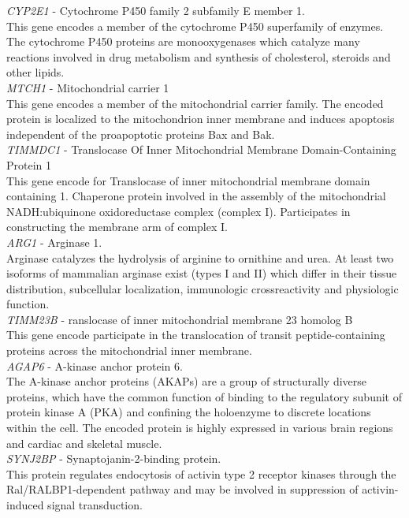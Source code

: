 \textit{CYP2E1} - Cytochrome P450 family 2 subfamily E member 1.\\
This gene encodes a member of the cytochrome P450 superfamily of enzymes. The cytochrome P450 proteins are monooxygenases which catalyze many reactions involved in drug metabolism and synthesis of cholesterol, steroids and other lipids.\\


\textit{MTCH1} - Mitochondrial carrier 1\\
This gene encodes a member of the mitochondrial carrier family. The encoded protein is localized to the mitochondrion inner membrane and induces apoptosis independent of the proapoptotic proteins Bax and Bak.\\

\textit{TIMMDC1} - Translocase Of Inner Mitochondrial Membrane Domain-Containing Protein 1 \\
This gene encode for Translocase of inner mitochondrial membrane domain containing 1.
Chaperone protein involved in the assembly of the mitochondrial NADH:ubiquinone oxidoreductase complex (complex I). Participates in constructing the membrane arm of complex I.\\

\textit{ARG1} -  Arginase 1.\\
Arginase catalyzes the hydrolysis of arginine to ornithine and urea. At least two isoforms of mammalian arginase exist (types I and II) which differ in their tissue distribution, subcellular localization, immunologic crossreactivity and physiologic function.\\

\textit{TIMM23B} - ranslocase of inner mitochondrial membrane 23 homolog B \\
This gene encode participate in the translocation of transit peptide-containing proteins across the mitochondrial inner membrane. \\

\textit{AGAP6} - A-kinase anchor protein 6.\\
The A-kinase anchor proteins (AKAPs) are a group of structurally diverse proteins, which have the common function of binding to the regulatory subunit of protein kinase A (PKA) and confining the holoenzyme to discrete locations within the cell.
The encoded protein is highly expressed in various brain regions and cardiac and skeletal muscle. \\

\textit{SYNJ2BP} - Synaptojanin-2-binding protein.\\
This protein regulates endocytosis of activin type 2 receptor kinases through the Ral/RALBP1-dependent pathway and may be involved in suppression of activin-induced signal transduction. \\


